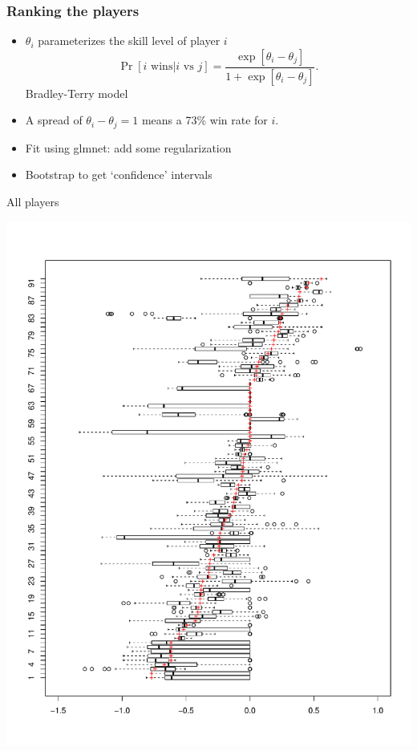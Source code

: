 \documentclass{beamer}
\begin{document}
\begin{frame}
\frametitle{Ranking the players}
\begin{itemize}
\item $\theta_i$ parameterizes the skill level of player $i$
\[\Pr[i\text{ wins}|i\text{ vs }j] = \frac{\exp[\theta_i - \theta_j]}{1 + \exp[\theta_i - \theta_j]}.
\]
Bradley-Terry model
\item A spread of $\theta_i - \theta_j = 1$ means a 73\% win rate for $i$.
\item Fit using glmnet: add some regularization
\item Bootstrap to get `confidence' intervals
\end{itemize}

\end{frame}

\begin{frame}
\begin{center}
All players

\includegraphics[scale = 0.25]{../prediction/ranking_ordered.pdf}
\end{center}
\end{frame}
\end{document}
